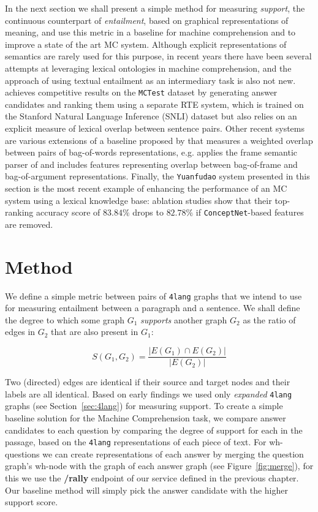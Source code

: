 In the next section we shall present a simple method for measuring
\textit{support}, the continuous counterpart of \textit{entailment},
based on graphical representations of meaning, and use this metric in a
baseline for machine comprehension and to improve a state of the art
MC system.
Although explicit representations of semantics are rarely used for this purpose,
in recent years there have been several attempts at leveraging lexical
ontologies in machine comprehension, and the approach of using textual
entailment as an intermediary task is also not new. \cite{Wang:2016}
achieves competitive results on the \texttt{MCTest} dataset
\cite{Richardson:2013} by generating
answer candidates and ranking them using a separate RTE system, which is
trained on the Stanford Natural Language Inference (SNLI) dataset
\cite{Bowman:2015}
but also relies on an explicit measure of lexical overlap between sentence
pairs. Other recent systems are various extensions of a baseline
proposed by \cite{Richardson:2013} that measures a weighted overlap
between pairs of bag-of-words representations, e.g. \cite{Wang:2015b}
applies the frame
semantic parser of \cite{Das:2010} and includes features representing
overlap between bag-of-frame and bag-of-argument representations.
Finally, the \texttt{Yuanfudao} system presented in this section is the most
recent example of enhancing the performance of an MC system using a lexical
knowledge base: ablation studies show that their top-ranking accuracy score of
$83.84\%$ drops to $82.78\%$ if \texttt{ConceptNet}-based features are removed.

\section{Method}
\label{sec:method}

We define a simple metric between pairs of \texttt{4lang} graphs that
we intend to use for measuring entailment between a paragraph and a
sentence. We shall define the degree to which some graph $G_1$
\textit{supports} another graph $G_2$ as the ratio of edges in $G_2$
that are also present in $G_1$:

\[ S(G_1, G_2) =\frac{|E(G_1)\cap E(G_2)|}{|E(G_2)|}\]

Two (directed) edges are identical if their source
and target nodes and their labels are all identical. Based on early
findings we used only \textit{expanded} \texttt{4lang} graphs (see
Section~\ref{sec:4lang}) for measuring support. 
To create a simple baseline solution for the Machine Comprehension task,
we compare answer candidates to each question by comparing the degree of
support for each in the passage, based on the \texttt{4lang} representations of
each piece of text. For wh-questions we can create representations of
each answer by merging the question graph's wh-node with the graph of
each answer graph (see Figure~\ref{fig:merge}), for this we use the \textbf{/rally} endpoint of our service defined in the previous chapter. Our baseline method will simply
pick the answer candidate with the higher support score.

